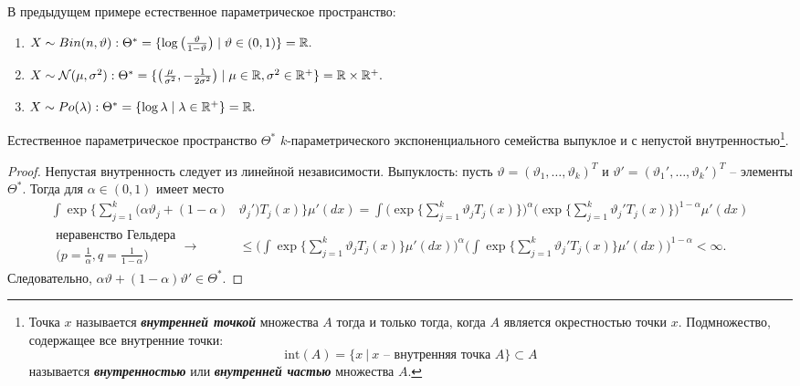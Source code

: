 \begin{exmp}
	В предыдущем примере естественное параметрическое пространство:
	\begin{enumerate}
		\item $X \sim Bin(n, \vartheta): \Theta^* = \{\log\big(\frac{\vartheta}{1-\vartheta}\big) \mid \vartheta \in (0, 1) \} = \mathbb{R}.$
		\item $X \sim \mathcal{N}(\mu, \sigma^2): \Theta^* = \{\big(\frac{\mu}{\sigma^2}, -\frac{1}{2\sigma^2}\big) \mid \mu \in \mathbb{R}, \sigma^2 \in \mathbb{R}^+ \} = \mathbb{R} \times \mathbb{R}^+.$
		\item $X \sim Po(\lambda): \Theta^* = \{\log \lambda \mid \lambda \in \mathbb{R}^+ \} = \mathbb{R}.$
	\end{enumerate}
\end{exmp}

\begin{thm}
	Естественное параметрическое пространство $\Theta^*$ $k$-параметрического экспоненциального семейства выпуклое и с непустой внутренностью\footnote{
			 Точка $x$ называется \textbf{\textit{внутренней точкой}} множества $A$ тогда и только тогда, когда $A$ является окрестностью точки $x$. Подмножество, содержащее все внутренние точки:
			 \[\mathrm{int}(A) = \{ x\ |\ x \text{ -- внутренняя точка } A\} \subset A \]
			называется \textbf{\textit{внутренностью}} или \textbf{\textit{внутренней частью}} множества $A$.
		}.
\end{thm}
\begin{proof}
	Непустая внутренность следует из линейной независимости. Выпуклость: пусть $\vartheta = (\vartheta_1, \dots, \vartheta_k)^T$ и $\vartheta' = (\vartheta_1', \dots, \vartheta_k')^T$ -- элементы $\Theta^*$. Тогда для $\alpha \in (0, 1)$ имеет место
	\[ \begin{aligned}
	  \int \exp \Big \{ \sum_{j = 1}^{k} (\alpha \vartheta_j + (1-\alpha) & \vartheta_j') T_j(x) \Big\}\mu'(dx) = \int \Big(\exp \Big \{\sum_{j = 1}^{k} \vartheta_j T_j(x) \Big\}\Big)^\alpha \Big(\exp \Big \{\sum_{j = 1}^{k} \vartheta_j' T_j(x) \Big\}\Big)^{1-\alpha} \mu'(dx) \\
	  \begin{aligned}\text{неравенство Гельдера} \\ \Big(p = \frac{1}{\alpha}, q = \frac{1}{1 - \alpha}\Big) \end{aligned}\longrightarrow & \leq  \Bigg(\int \exp \Big \{\sum_{j = 1}^{k} \vartheta_j T_j(x) \Big\}\mu'(dx)\Bigg)^\alpha \Bigg(\int\exp \Big \{\sum_{j = 1}^{k} \vartheta_j' T_j(x) \Big\}\mu'(dx) \Bigg)^{1-\alpha} < \infty.
	\end{aligned} \]
	Следовательно, $\alpha \vartheta + (1-\alpha)\vartheta' \in \Theta^*$.
\end{proof}

